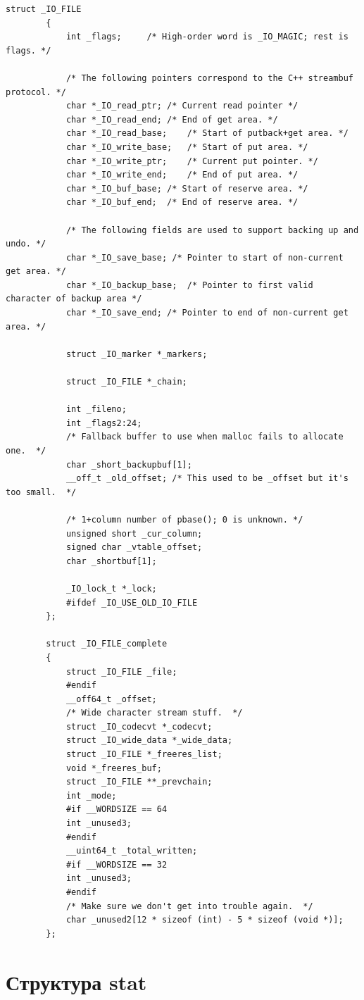 	\begin{lstlisting}[caption={\_IO\_FILE /libio/bits/types/struct\_FILE.h}, label={code:iofile}]
		struct _IO_FILE
		{
			int _flags;		/* High-order word is _IO_MAGIC; rest is flags. */
			
			/* The following pointers correspond to the C++ streambuf protocol. */
			char *_IO_read_ptr;	/* Current read pointer */
			char *_IO_read_end;	/* End of get area. */
			char *_IO_read_base;	/* Start of putback+get area. */
			char *_IO_write_base;	/* Start of put area. */
			char *_IO_write_ptr;	/* Current put pointer. */
			char *_IO_write_end;	/* End of put area. */
			char *_IO_buf_base;	/* Start of reserve area. */
			char *_IO_buf_end;	/* End of reserve area. */
			
			/* The following fields are used to support backing up and undo. */
			char *_IO_save_base; /* Pointer to start of non-current get area. */
			char *_IO_backup_base;  /* Pointer to first valid character of backup area */
			char *_IO_save_end; /* Pointer to end of non-current get area. */
			
			struct _IO_marker *_markers;
			
			struct _IO_FILE *_chain;
			
			int _fileno;
			int _flags2:24;
			/* Fallback buffer to use when malloc fails to allocate one.  */
			char _short_backupbuf[1];
			__off_t _old_offset; /* This used to be _offset but it's too small.  */
			
			/* 1+column number of pbase(); 0 is unknown. */
			unsigned short _cur_column;
			signed char _vtable_offset;
			char _shortbuf[1];
			
			_IO_lock_t *_lock;
			#ifdef _IO_USE_OLD_IO_FILE
		};
		
		struct _IO_FILE_complete
		{
			struct _IO_FILE _file;
			#endif
			__off64_t _offset;
			/* Wide character stream stuff.  */
			struct _IO_codecvt *_codecvt;
			struct _IO_wide_data *_wide_data;
			struct _IO_FILE *_freeres_list;
			void *_freeres_buf;
			struct _IO_FILE **_prevchain;
			int _mode;
			#if __WORDSIZE == 64
			int _unused3;
			#endif
			__uint64_t _total_written;
			#if __WORDSIZE == 32
			int _unused3;
			#endif
			/* Make sure we don't get into trouble again.  */
			char _unused2[12 * sizeof (int) - 5 * sizeof (void *)];
		};
	\end{lstlisting}
	
	\section{Структура stat}
	
